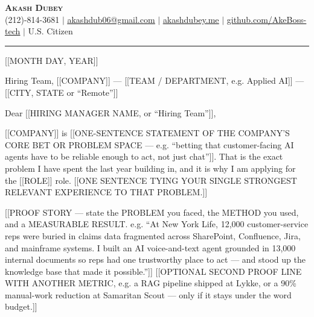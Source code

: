 \documentclass[letterpaper,11pt]{article}
\begin{document}
\begin{center}
    \textbf{\Huge \scshape Akash Dubey} \\ \vspace{2pt}
    \small (212)-814-3681 $|$ \href{mailto:akashdub06@gmail.com}{\underline{akashdub06@gmail.com}} $|$
    \href{https://akashdubey.me/}{\underline{akashdubey.me}} $|$
    \href{https://github.com/AkeBoss-tech}{\underline{github.com/AkeBoss-tech}} $|$
    \small U.S. Citizen
\end{center}
\vspace{4pt}
\hrule
\vspace{10pt}

[[MONTH DAY, YEAR]]

\vspace{2pt}
Hiring Team, [[COMPANY]] --- [[TEAM / DEPARTMENT, e.g. Applied AI]] --- [[CITY, STATE or ``Remote'']]

\vspace{6pt}
Dear [[HIRING MANAGER NAME, or ``Hiring Team'']],

[[COMPANY]] is [[ONE-SENTENCE STATEMENT OF THE COMPANY'S CORE BET OR PROBLEM
SPACE --- e.g. ``betting that customer-facing AI agents have to be reliable
enough to act, not just chat'']]. That is the exact problem I have spent the
last year building in, and it is why I am applying for the [[ROLE]] role.
[[ONE SENTENCE TYING YOUR SINGLE STRONGEST RELEVANT EXPERIENCE TO THAT
PROBLEM.]]

[[PROOF STORY --- state the PROBLEM you faced, the METHOD you used, and a
MEASURABLE RESULT. e.g. ``At New York Life, 12,000 customer-service reps were
buried in claims data fragmented across SharePoint, Confluence, Jira, and
mainframe systems. I built an AI voice-and-text agent grounded in 13,000
internal documents so reps had one trustworthy place to act --- and stood up
the knowledge base that made it possible.'']] [[OPTIONAL SECOND PROOF LINE WITH
ANOTHER METRIC, e.g. a RAG pipeline shipped at Lykke, or a 90\% manual-work
reduction at Samaritan Scout --- only if it stays under the word budget.]]
\end{document}
